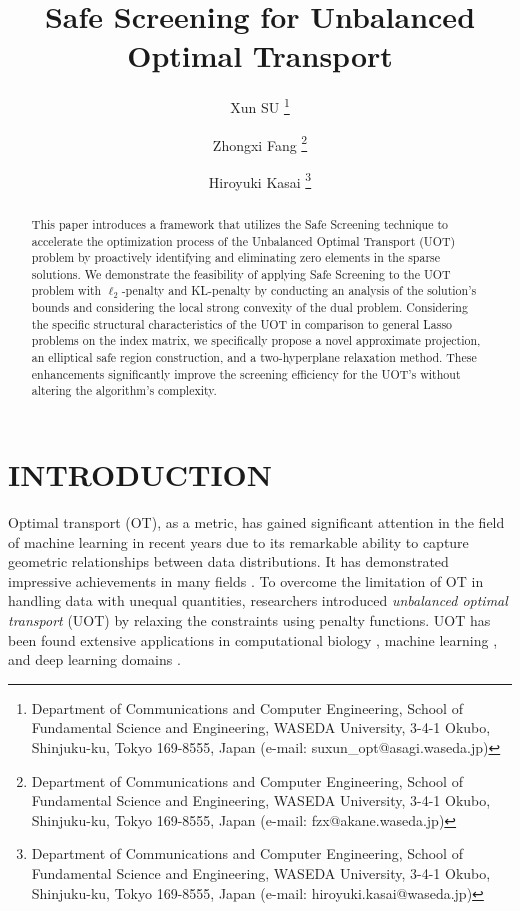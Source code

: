 \documentclass[11pt]{article}
\title{Safe Screening for Unbalanced Optimal Transport}
\author{
Xun SU \thanks{Department of Communications and Computer Engineering, School of Fundamental Science and Engineering, WASEDA University, 3-4-1 Okubo, Shinjuku-ku, Tokyo 169-8555, Japan (e-mail: suxun\_opt@asagi.waseda.jp) }
 \and Zhongxi Fang \thanks{Department of Communications and Computer Engineering, School of Fundamental Science and Engineering, WASEDA University, 3-4-1 Okubo, Shinjuku-ku, Tokyo 169-8555, Japan (e-mail: fzx@akane.waseda.jp) }
 \and Hiroyuki Kasai \thanks{Department of Communications and Computer Engineering, School of Fundamental Science and Engineering, WASEDA University, 3-4-1 Okubo, Shinjuku-ku, Tokyo 169-8555, Japan (e-mail: hiroyuki.kasai@waseda.jp)}
 }
\begin{document}

\maketitle

\begin{abstract}
This paper introduces a framework that utilizes the Safe Screening technique to accelerate the optimization process of the Unbalanced Optimal Transport (UOT) problem by proactively identifying and eliminating zero elements in the sparse solutions. We demonstrate the feasibility of applying Safe Screening to the UOT problem with $\ell_2$-penalty and KL-penalty by conducting an analysis of the solution's bounds and considering the local strong convexity of the dual problem. Considering the specific structural characteristics of the UOT in comparison to general Lasso problems on the index matrix, we specifically propose a novel approximate projection, an elliptical safe region construction, and a two-hyperplane relaxation method. These enhancements significantly improve the screening efficiency for the UOT's without altering the algorithm's complexity.
\end{abstract}


\section{INTRODUCTION}
\label{sec:int}

Optimal transport (OT), as a metric, has gained significant attention in the field of machine learning in recent years due to its remarkable ability to capture geometric relationships between data distributions. It has demonstrated impressive achievements in many fields \cite{Courty_PAMI_2017, arjovsky2017wasserstein, Chen_ICLR_2019,Maretic_NIPS_2019}. To overcome the limitation of OT in handling data with unequal quantities, researchers introduced {\it unbalanced optimal transport} (UOT) \cite{refId0} by relaxing the constraints using penalty functions. UOT has been found extensive applications in computational biology \cite{Schiebinger_CELL_2019}, machine learning \cite{Janati_AISTATS_2019}, and deep learning domains \cite{Yang_ICLR_2019}.
\end{document}
